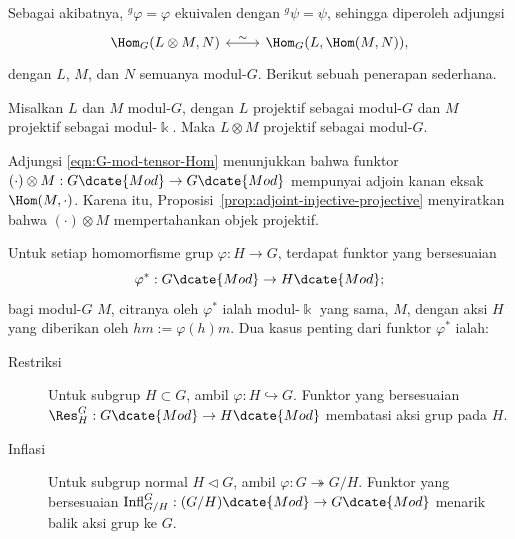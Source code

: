 Sebagai akibatnya, ${}^g\varphi=\varphi$ ekuivalen dengan
${}^g\psi=\psi$, sehingga diperoleh adjungsi
\begin{equation}\label{eqn:G-mod-tensor-Hom}
	\begin{tikzcd}
		\Hom_G(L \otimes M, N) \arrow[leftrightarrow, r, "\sim"] & \Hom_G(L, \Hom(M, N)),
	\end{tikzcd}
\end{equation}
dengan $L$, $M$, dan $N$ semuanya modul-$G$. Berikut sebuah penerapan
sederhana.

\begin{proposisi}\label{prop:group-tensor-proj}
	Misalkan $L$ dan $M$ modul-$G$, dengan $L$ projektif sebagai modul-$G$ dan
	$M$ projektif sebagai modul-$\Bbbk$. Maka $L\otimes M$ projektif sebagai
	modul-$G$.
\end{proposisi}

\begin{bukti}
	Adjungsi \eqref{eqn:G-mod-tensor-Hom} menunjukkan bahwa funktor
	$(\cdot)\otimes M:G\dcate{Mod}\to G\dcate{Mod}$ mempunyai adjoin kanan eksak
	$\Hom(M,\cdot)$. Karena itu,
	Proposisi~\ref{prop:adjoint-injective-projective} menyiratkan bahwa
	$(\cdot)\otimes M$ mempertahankan objek projektif.
\end{bukti}

\begin{definisi}\label{def:Res-Infl}
	Untuk setiap homomorfisme grup $\varphi:H\to G$, terdapat funktor yang
	bersesuaian
	\[ \varphi^*: G\dcate{Mod} \to H\dcate{Mod}; \]
	bagi modul-$G$ $M$, citranya oleh $\varphi^*$ ialah modul-$\Bbbk$ yang sama,
	$M$, dengan aksi $H$ yang diberikan oleh $hm:=\varphi(h)m$. Dua kasus penting
	dari funktor $\varphi^*$ ialah:
	\begin{description}
		\item[Restriksi] Untuk subgrup $H\subset G$, ambil
		$\varphi:H\hookrightarrow G$. Funktor yang bersesuaian
		$\Res^G_H:G\dcate{Mod}\to H\dcate{Mod}$ membatasi aksi grup pada $H$.
		\item[Inflasi] Untuk subgrup normal $H\lhd G$, ambil
		$\varphi:G\twoheadrightarrow G/H$. Funktor yang bersesuaian
		$\mathrm{Infl}^G_{G/H}:(G/H)\dcate{Mod}\to G\dcate{Mod}$ menarik balik
		aksi grup ke $G$.
	\end{description}
\end{definisi}

